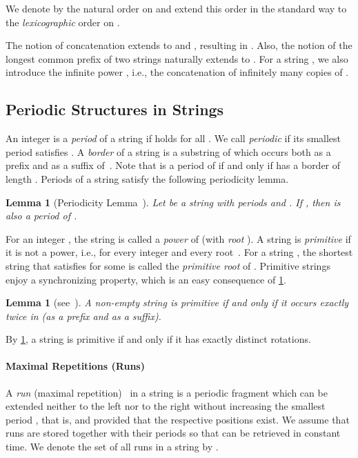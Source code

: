 \documentclass[a4paper]{article}
\newtheorem{lemma}[theorem]{Lemma}
\theoremstyle{definition}
\theoremstyle{remark}
\begin{document}
We denote by  the natural order on 
and extend this order in the standard way to the \emph{lexicographic} order on .

The notion of concatenation  extends to  and , resulting in .
Also, the notion of the longest common prefix of two strings naturally extends to .
For a string , we also introduce the infinite power , i.e., the concatenation of infinitely many copies of .

\subsection{Periodic Structures in Strings}\label{sec:per_struct}
An integer  is a \emph{period} of a string  if  holds for all .
We call  \emph{periodic} if its smallest period satisfies .
A \emph{border} of a string  is a substring of  which occurs both as a prefix and as a suffix of~.
Note that  is a period of  if and only if  has a border of length .
Periods of a string  satisfy the following periodicity lemma.
\begin{lemma}[Periodicity Lemma~\cite{MR0162838,fine1965uniqueness}]\label{lem:per}
Let  be a string with periods  and .
If , then  is also a period of .
\end{lemma}

For an integer , the string  is called a \emph{power} of  (with \emph{root} ).
A string  is \emph{primitive} if it is not a power,
i.e.,  for every integer  and every root~.
For a string , the shortest string  that satisfies  for some  is called the \emph{primitive root} of .
Primitive strings enjoy a synchronizing property, which is an easy consequence of \cref{lem:per}.

\begin{lemma}[{see~\cite[{Lemma~1.11}]{AlgorithmsOnStrings}}]\label{lem:synchr}
A non-empty string  is primitive if and only if it occurs exactly twice in  (as a prefix and as a suffix).
\end{lemma}

By \cref{lem:synchr}, a string  is primitive if and only if it has exactly  distinct rotations.


\paragraph{Maximal Repetitions (Runs)}\label{sec:runs}
A \emph{run} (maximal repetition)~\cite{DBLP:journals/dam/Main89,DBLP:conf/focs/KolpakovK99} in a string  is a periodic fragment
 which can be extended neither to the left nor to the right without increasing the smallest period ,
that is,  and  provided that the respective positions exist.
We assume that runs are stored together with their periods so that  can be retrieved in constant time.
We denote the set of all runs in a string  by .
\end{document}
